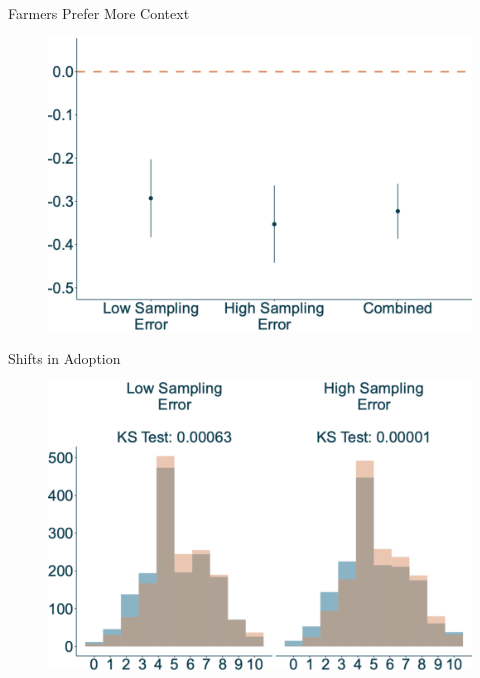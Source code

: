 \documentclass[
  ignorenonframetext,
]{beamer}
\begin{document}
\begin{frame}{Farmers Prefer More Context}
\protect\hypertarget{farmers-prefer-more-context}{}
\begin{figure}

{\centering \includegraphics{presentation2_files/figure-beamer/unnamed-chunk-3-1.svg}

}

\end{figure}

\begin{block}{Shifts in Adoption}
\protect\hypertarget{shifts-in-adoption}{}
\begin{figure}

{\centering \includegraphics{presentation2_files/figure-beamer/unnamed-chunk-4-1.svg}

}

\end{figure}
\end{block}
\end{frame}
\end{document}

